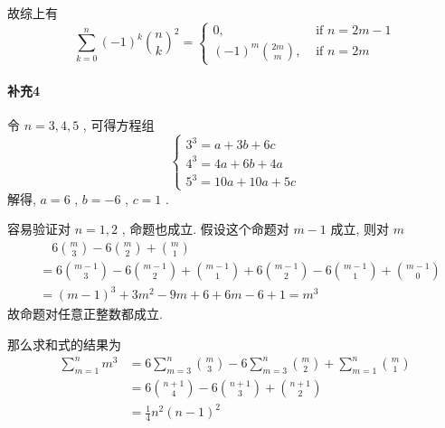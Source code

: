 \documentclass[a4paper, UTF8]{ctexart}				%
\numberwithin{equation}{section}				%
\begin{document}
        故综上有 
        \[
            \sum^{n}_{k=0} (-1)^k {n \choose k}^2 =
            \begin{cases}
                0, &\text{ if }n=2m-1\\
                (-1)^m {2m \choose m}, &\text{ if }n=2m
            \end{cases}
        \]
        

    \paragraph{补充4}\quad 
        令 $n = 3,4,5$ , 可得方程组 
        \[
            \begin{cases}
                3^3 = a + 3 b + 6 c\\
                4^3 = 4 a + 6 b + 4 a\\
                5^3 = 10 a + 10 a + 5 c
            \end{cases}
        \]
        解得, $a = 6$ , $b = -6$ , $c= 1$ .
        
        容易验证对 $n = 1, 2$ , 命题也成立. 假设这个命题对 $m-1$ 成立, 则对 $m$
        \begin{equation*}
            \begin{split}
                & \quad 6{m \choose 3} -6 {m \choose 2} + {m \choose 1}\\
                & = 6{m - 1 \choose 3} -6 {m - 1 \choose 2} + {m - 1 \choose 1} + 6{m - 1 \choose 2} -6 {m - 1 \choose 1} + {m - 1 \choose 0}\\
                & = (m - 1)^3 + 3 m^2 - 9m + 6 + 6m -6 + 1 = m^3
            \end{split}
        \end{equation*}
        故命题对任意正整数都成立.

        那么求和式的结果为
        \begin{equation*}
            \begin{split}
                \sum^{n}_{m=1} m^3 
                & = 6\sum^{n}_{m=3}{m \choose 3} -6\sum^{n}_{m=3}{m \choose 2} + \sum^{n}_{m=1}{m \choose 1}\\
                & = 6 {n + 1 \choose 4} -6 {n+1 \choose 3} + {n+1 \choose 2}\\
                & = \frac{1}{4} n^2(n-1)^2
            \end{split}
        \end{equation*}
\end{document}
